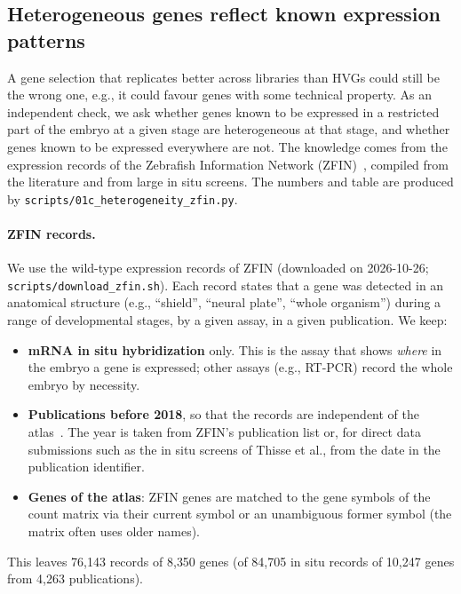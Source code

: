 \documentclass[11pt,a4paper]{article}
\begin{document}
\begin{table}[t]
	\centering
	\footnotesize
	\caption{Heterogeneous genes per stage. Weak, Mod., Strong: genes in the tier in at least half of the stage's libraries. The last three columns compare the heterogeneous (weak) genes with the 2{,}000 Seurat HVGs of the pooled stage (Both: in both sets); in brackets, the median number of UMIs of the genes in the whole stage.}
	\label{tab:heterogeneity}
	\setlength{\tabcolsep}{4pt}
	
\end{table}

\subsection{Heterogeneous genes reflect known expression patterns}
\label{sec:heterogeneity-zfin}

A gene selection that replicates better across libraries than HVGs could still be the wrong one, e.g., it could favour genes with some technical property. As an independent check, we ask whether genes known to be expressed in a restricted part of the embryo at a given stage are heterogeneous at that stage, and whether genes known to be expressed everywhere are not. The knowledge comes from the expression records of the Zebrafish Information Network (ZFIN)~\cite{bradford2022zfin}, compiled from the literature and from large in situ screens. The numbers and table are produced by \nolinkurl{scripts/01c_heterogeneity_zfin.py}.

\paragraph{ZFIN records.} We use the wild-type expression records of ZFIN (downloaded on 2026-10-26; \nolinkurl{scripts/download_zfin.sh}). Each record states that a gene was detected in an anatomical structure (e.g., ``shield'', ``neural plate'', ``whole organism'') during a range of developmental stages, by a given assay, in a given publication. We keep:
\begin{itemize}
	\item \textbf{mRNA in situ hybridization} only. This is the assay that shows \emph{where} in the embryo a gene is expressed; other assays (e.g., RT-PCR) record the whole embryo by necessity.
	\item \textbf{Publications before 2018}, so that the records are independent of the atlas~\cite{farrell2018}. The year is taken from ZFIN's publication list or, for direct data submissions such as the in situ screens of Thisse et al., from the date in the publication identifier.
	\item \textbf{Genes of the atlas}: ZFIN genes are matched to the gene symbols of the count matrix via their current symbol or an unambiguous former symbol (the matrix often uses older names).
\end{itemize}
This leaves 76{,}143 records of 8{,}350 genes (of 84{,}705 in situ records of 10{,}247 genes from 4{,}263 publications).
\end{document}

